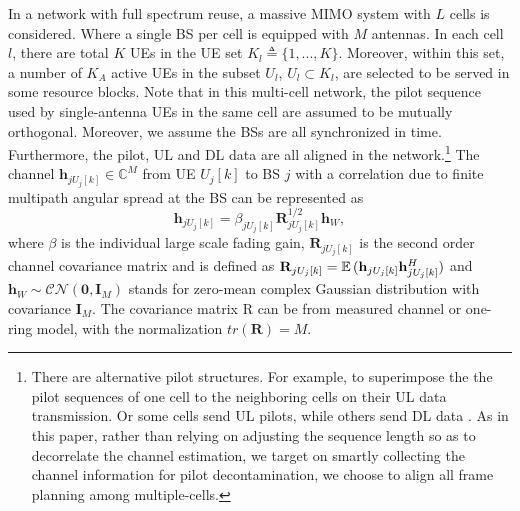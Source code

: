 In a network with full spectrum reuse, a massive MIMO system with $L$ cells is considered. Where a single BS per cell is equipped 
with $M$ antennas. %
In each cell $l$, there are total $K$ UEs in the UE set $K_l\triangleq\{1,...,K\}$. Moreover, within this set, a number of $K_A$ active UEs in the subset $U_l$, $U_l\subset K_l$, are selected to be served in some resource blocks. Note that in this multi-cell network, the pilot sequence used by single-antenna UEs in the same
cell are assumed to be mutually orthogonal. Moreover, we assume the BSs are all synchronized in time. Furthermore, the pilot, UL and DL data are all aligned in the network.\footnote{There are alternative pilot structures. For example, to superimpose the the pilot sequences of one cell to the neighboring cells on their UL data transmission\cite{upadhya2017superimposed}. Or some cells send UL pilots, while others send DL data \cite{fernandes2013inter}. As in this paper, rather than relying on adjusting the sequence length so as to decorrelate the channel estimation, we target on smartly collecting the channel information for pilot decontamination, we choose to align all frame planning among multiple-cells.} The channel $\mathbf{h}_{jU_j[k]}\in\mathbb{C}^{M}$ from UE $U_j[k]$ to BS $j$ with a correlation due to finite multipath angular spread at the BS  can be represented as
\begin{equation}
\mathbf{h}_{jU_{j}[k]}=\beta_{jU_{j}[k]}\mathbf{R}_{jU_{j}[k]}^{1/2}\mathbf{h}_{W},
\end{equation}
where $\beta$ is the individual large scale fading gain, $\mathbf{R}_{jU_{j}[k]}$ is the second order channel covariance matrix and is defined as $\mathbf{R}_{jU_j[k]}=\operatorname{\mathbb{E}}{({\mathbf{h}}_{jU_j[k]}{\mathbf{h}}_{jU_j[k]}^H)}$ and $\mathbf{h}_{W}\sim \mathcal{CN}\left(\mathbf{0},\mathbf{I}_M\right)$ stands for zero-mean complex Gaussian distribution with covariance $\mathbf{I}_M$. The covariance matrix R can be from measured channel or one-ring model, with the normalization $tr(\mathbf{R})=M$.

